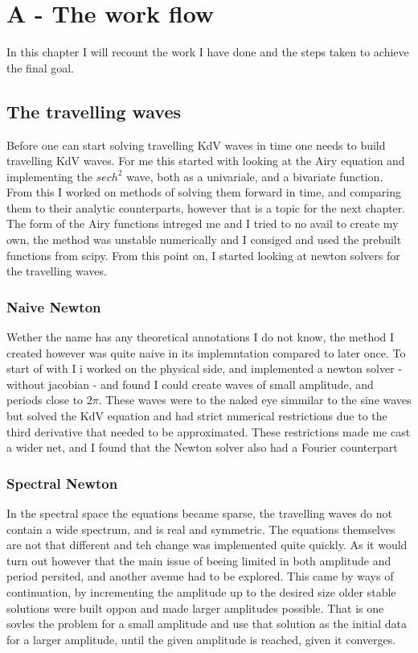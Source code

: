 \chapter{A - The work flow}
In this chapter I will recount the work I have done and the steps taken to achieve the final goal.
\section{The travelling waves}
Before one can start solving travelling KdV waves in time one needs to build travelling KdV waves. 
For me this started with looking at the Airy equation and implementing the $sech^2$ wave, both as a univariale, and a bivariate function. 
From this I worked on methods of solving them forward in time, and comparing them to their analytic counterparts, however that is a topic for the next chapter.
The form of the Airy functions intreged me and I tried to no avail to create my own, the method was unstable numerically and I consiged and used the prebuilt functions from scipy.
From this point on, I started looking at newton solvers for the travelling waves. 

    \subsection{Naive Newton}
    Wether the name has any theoretical annotations I do not know, the method I created however was quite naive in its implemntation compared to later once. 
    To start of with I i worked on the physical side, and implemented a newton solver - without jacobian - and found I could create waves of small amplitude, and periods close to $2 \pi$. 
    These waves were to the naked eye simmilar to the sine waves but solved the KdV equation and had strict numerical restrictions due to the third derivative that needed to be approximated. 
    These restrictions made me cast a wider net, and I found that the Newton solver also had a Fourier counterpart

    \subsection{Spectral Newton}
    In the spectral space the equations became sparse, the travelling waves do not contain a wide spectrum, and is real and symmetric.
    The equations themselves are not that different and teh change was implemented quite quickly. 
    As it would turn out however that the main issue of beeing limited in both amplitude and period persited, and another avenue had to be explored. 
    This came by ways of continuation, by incrementing the amplitude up to the desired size older stable solutions 
    were built oppon and made larger amplitudes possible. That is one sovles the problem for a small amplitude
    and use that solution as the initial data for a larger amplitude, until the given amplitude is reached,
    given it converges. 




